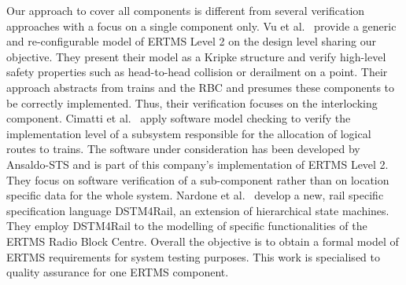 Our approach to cover all components is different from several
verification approaches with a focus on a single component only.
%
Vu et al.~\cite{vu15} provide a generic and re-configurable model of
ERTMS Level 2 on the design level sharing our objective. They present
their model as a Kripke structure and verify high-level safety
properties such as head-to-head collision or derailment on a point.
%
Their approach
%
abstracts from trains and the RBC and presumes these components to be
correctly implemented. Thus, their verification focuses on the
interlocking component.
%
%
Cimatti et al.~\cite{cimatti12} apply software model checking to
verify the implementation level of a subsystem responsible for the
allocation of logical routes to trains. The software under
consideration has been developed by Ansaldo-STS and is part of this
company's implementation of ERTMS Level 2. %
They focus on software verification of a sub-component rather than on
location specific data for the whole system.
%
Nardone et al.~\cite{nardone14} develop a new, rail specific
specification language DSTM4Rail, an extension of hierarchical state
machines. They employ DSTM4Rail to the modelling of specific
functionalities of the ERTMS Radio Block Centre. Overall the objective
is to obtain a formal model of ERTMS requirements for system testing
purposes. %
This work is specialised to quality assurance for one ERTMS component.


